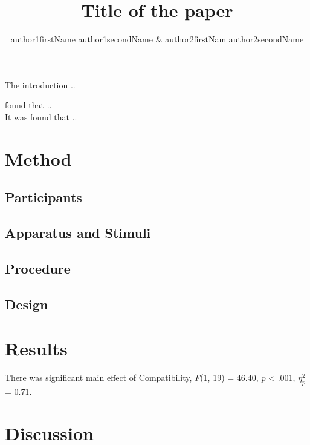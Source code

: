 \documentclass[man, 12pt]{apa6}\usepackage[]{graphicx}\usepackage[]{color}
\title{Title of the paper}
\author{author1firstName author1secondName \& author2firstNam
author2secondName}
\affiliation{Department of Psychology, University of XXX}
\begin{document}
\maketitle
The introduction .. \textcite{botvinick2001conflict}

\textcite{botvinick2001conflict} found that .. \\
It was found that .. \parencite[][]{simon1969reactions, eriksen1974effects, stroop1935studies}

\section{Method}
\subsection{Participants}
\subsection{Apparatus and Stimuli}
\subsection{Procedure}

\subsection{Design}

\section{Results}





There was significant main effect of Compatibility, \emph{F}(1, 19) = 46.40, \emph{p} < .001, $\eta_{p}^2$ = 0.71.

\section{Discussion}

\printbibliography
\end{document}
